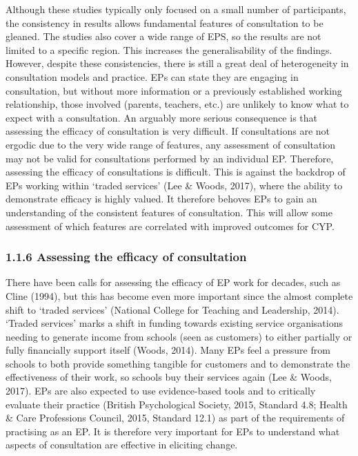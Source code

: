 \documentclass[
  english,
  man]{apa}
\begin{document}
Although these studies typically only focused on a small number of participants, the consistency in results allows fundamental features of consultation to be gleaned. The studies also cover a wide range of EPS, so the results are not limited to a specific region. This increases the generalisability of the findings. However, despite these consistencies, there is still a great deal of heterogeneity in consultation models and practice. EPs can state they are engaging in consultation, but without more information or a previously established working relationship, those involved (parents, teachers, etc.) are unlikely to know what to expect with a consultation. An arguably more serious consequence is that assessing the efficacy of consultation is very difficult. If consultations are not ergodic due to the very wide range of features, any assessment of consultation may not be valid for consultations performed by an individual EP. Therefore, assessing the efficacy of consultations is difficult. This is against the backdrop of EPs working within `traded services' (Lee \& Woods, 2017), where the ability to demonstrate efficacy is highly valued. It therefore behoves EPs to gain an understanding of the consistent features of consultation. This will allow some assessment of which features are correlated with improved outcomes for CYP.

\hypertarget{assessing-the-efficacy-of-consultation}{%
\subsubsection{1.1.6 Assessing the efficacy of consultation}\label{assessing-the-efficacy-of-consultation}}

There have been calls for assessing the efficacy of EP work for decades, such as Cline (1994), but this has become even more important since the almost complete shift to `traded services' (National College for Teaching and Leadership, 2014). `Traded services' marks a shift in funding towards existing service organisations needing to generate income from schools (seen as customers) to either partially or fully financially support itself (Woods, 2014). Many EPs feel a pressure from schools to both provide something tangible for customers and to demonstrate the effectiveness of their work, so schools buy their services again (Lee \& Woods, 2017). EPs are also expected to use evidence-based tools and to critically evaluate their practice (British Psychological Society, 2015, Standard 4.8; Health \& Care Professions Council, 2015, Standard 12.1) as part of the requirements of practising as an EP. It is therefore very important for EPs to understand what aspects of consultation are effective in eliciting change.
\end{document}
